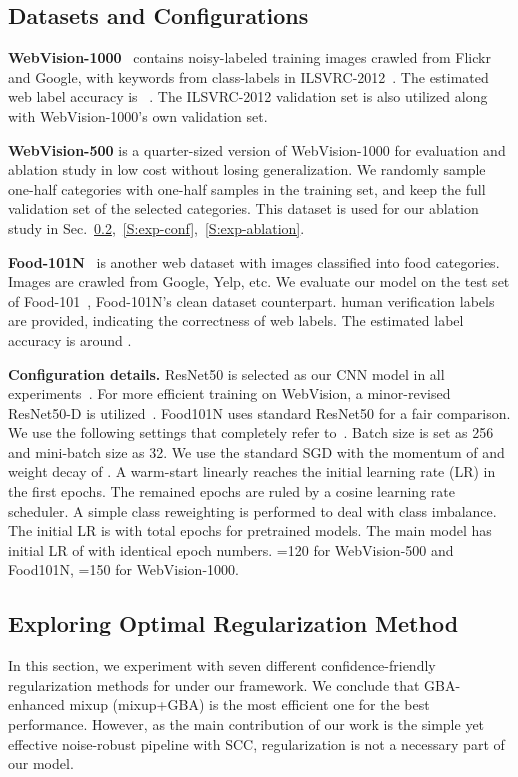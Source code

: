 \documentclass[runningheads]{llncs}
\begin{document}
\subsection{Datasets and Configurations}
\label{S:Dataset}
\textbf{WebVision-1000}~\cite{li2017WebVision} contains  noisy-labeled training images crawled from Flickr and Google, with keywords from  class-labels in ILSVRC-2012~\cite{deng2009imagenet}.
The estimated web label accuracy is ~\cite{guo2018curriculumnet}. 
The ILSVRC-2012 validation set is also utilized along with WebVision-1000's own validation set.

\textbf{WebVision-500} is a quarter-sized version of WebVision-1000 for evaluation and ablation study in low cost without losing generalization. We randomly sample one-half categories with one-half samples in the training set, and keep the full validation set of the selected  categories. This dataset is used for our ablation study in Sec.~\ref{S:exp-regular},~\ref{S:exp-conf},~\ref{S:exp-ablation}. 

\textbf{Food-101N}~\cite{lee2018cleannet} is another web dataset with  images classified into  food categories. Images are crawled from Google, Yelp, etc. We evaluate our model on the test set of Food-101~\cite{bossard2014food}, Food-101N's clean dataset counterpart.  human verification labels are provided, indicating the correctness of web labels. The estimated label accuracy is around .

\textbf{Configuration details.}
ResNet50 is selected as our CNN model in all experiments~\cite{he2016deep}. 
For more efficient training on WebVision, a minor-revised ResNet50-D is utilized~\cite{he2019bag}. Food101N uses standard ResNet50 for a fair comparison.
We use the following settings that completely refer to~\cite{he2019bag}.
Batch size is set as 256 and mini-batch size as 32. We use the standard SGD with the momentum of  and weight decay of . A warm-start linearly reaches the initial learning rate (LR) in the first  epochs. The remained epochs are ruled by a cosine learning rate scheduler. A simple class reweighting is performed to deal with class imbalance. The initial LR is  with total  epochs for pretrained models. The main model has initial LR of  with identical epoch numbers. =120 for WebVision-500 and Food101N, =150 for WebVision-1000.
	
\subsection{Exploring Optimal Regularization Method}
\label{S:exp-regular}
In this section, we experiment with seven different confidence-friendly regularization methods for  under our framework. We conclude that GBA-enhanced mixup (mixup+GBA) is the most efficient one for the best performance. However, as the main contribution of our work is the simple yet effective noise-robust pipeline with SCC, regularization is not a necessary part of our model.
\end{document}
